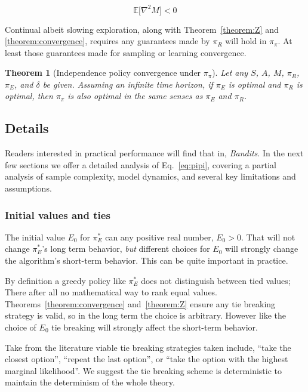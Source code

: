 \documentclass[9pt,lineno]{elife}
\newtheorem{theorem}{Theorem}
\begin{document}
\begin{equation}
\label{eq:ax2strict}
    \mathbb{E}\big [\nabla^2 M \big ] < 0
\end{equation}

Continual albeit slowing exploration, along with Theorem~\ref{theorem:Z} and \ref{theorem:convergence}, requires any guarantees made by $\pi_R$ will hold in $\pi_{\pi}$. At least those guarantees made for sampling or learning convergence.

\begin{theorem}[Independence policy convergence under $\pi_{\pi}$] \label{theorem:meta} 
	 Let any $S$, $A$, $M$, $\pi_R$, $\pi_E$, and $\delta$ be given. Assuming an infinite time horizon, if $\pi_E$ is optimal and $\pi_R$ is optimal, then $\pi_{\pi}$ is also optimal in the same senses as $\pi_E$ and $\pi_R$. 
\end{theorem}


\subsection*{Details} Readers interested in practical performance will find that in, \textit{Bandits}. In the next few sections we offer a detailed analysis of Eq.~\ref{eq:pipi}, covering a partial analysis of sample complexity, model dynamics, and several key limitations and assumptions. 

\subsubsection*{Initial values and ties} \label{sec:init_ties}
The initial value $E_0$ for $\pi^*_E$ can any positive real number, $E_0 > 0$. That will not change $\pi^*_E$'s long term behavior, \textit{but} different choices for $E_0$ will strongly change the algorithm's short-term behavior. This can be quite important in practice. 

By definition a greedy policy like $\pi^*_E$ does not distinguish between tied values; There after all no mathematical way to rank equal values. Theorems~\ref{theorem:convergence} and~\ref{theorem:Z} ensure any tie breaking strategy is valid, so in the long term the choice is arbitrary. However like the choice of $E_0$ tie breaking will strongly affect the short-term behavior. 

Take from the literature viable tie breaking strategies taken include, ``take the closest option'', ``repeat the last option'', or ``take the option with the highest marginal likelihood''. We suggest the tie breaking scheme is deterministic to maintain the determinism of the whole theory.
\end{document}
